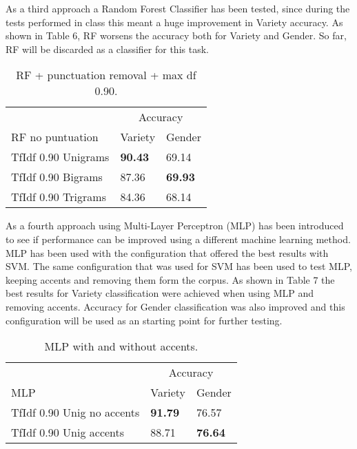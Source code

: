 \documentclass[11pt,a4paper]{article}
\begin{document}
As a third approach a Random Forest Classifier has been tested, since during the tests performed in class this meant a huge improvement in Variety accuracy. As shown in Table 6, RF worsens the accuracy both for Variety and Gender. So far, RF will be discarded as a classifier for this task.

\begin{table}[htbp]
\begin{center}
\begin{tabular}{|l|l|l|}
\hline
& \multicolumn{2}{c|}{Accuracy} \\
\cline{2-3}
RF no puntuation & Variety & Gender \\
\hline \hline
TfIdf 0.90 Unigrams & \textbf{90.43} & 69.14 \\ \hline
TfIdf 0.90 Bigrams & 87.36 & \textbf{69.93} \\ \hline
TfIdf 0.90 Trigrams & 84.36 & 68.14 \\ \hline
\end{tabular}
\caption{RF + punctuation removal + max df 0.90.}
\label{tabla:sencilla}
\end{center}
\end{table}

As a fourth approach using Multi-Layer Perceptron (MLP) has been introduced to see if performance can be improved using a different machine learning method. MLP has been used with the configuration that offered the best results with SVM. The same configuration that was used for SVM has been used to test MLP, keeping accents and removing them form the corpus. As shown in Table 7 the best results for Variety classification were achieved when using MLP and removing accents. Accuracy for Gender classification was also improved and this configuration will be used as an starting point for further testing.

\begin{table}[htbp]
\begin{center}
\begin{tabular}{|l|l|l|}
\hline
& \multicolumn{2}{c|}{Accuracy} \\
\cline{2-3}
MLP & Variety & Gender \\
\hline \hline
TfIdf 0.90 Unig no accents & \textbf{91.79} & 76.57 \\ \hline
TfIdf 0.90 Unig accents & 88.71 & \textbf{76.64} \\ \hline
\end{tabular}
\caption{MLP with and without accents.}
\label{tabla:sencilla}
\end{center}
\end{table}
\end{document}
